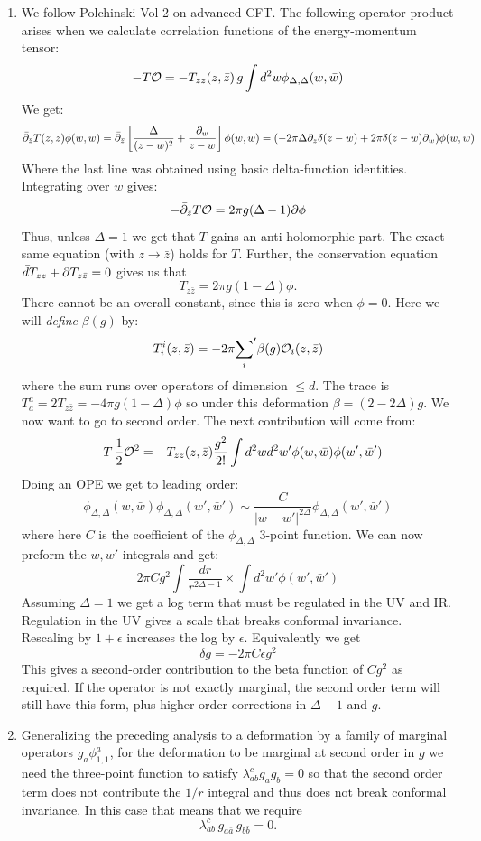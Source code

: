 \documentclass[11pt]{article}
\begin{document}
\begin{enumerate}
	\item We follow Polchinski Vol 2 on advanced CFT. The following operator product arises when we calculate correlation functions of the energy-momentum tensor:
	\[
		- T \mathcal{O} = - T_{zz}(z, \bar z)\, g \int d^2 w \phi_{\Delta, \Delta}(w, \bar w)
	\]
	We get:
	\[
		\bar {\partial}_{\bar z} T(z, \bar z) \phi(w, \bar w) = \bar {\partial}_{\bar z} \left[ \frac{\Delta}{(z-w)^2} + \frac{\partial_w}{z- w} \right] \phi(w, \bar w) = (-2 \pi \Delta \partial_z \delta(z - w) + 2 \pi \delta(z - w) \partial_w) \phi(w, \bar w)
	\]
	Where the last line was obtained using basic delta-function identities. Integrating over $w$ gives:
	\[
		- \bar {\partial}_{\bar z} T \mathcal{O} = 2 \pi g (\Delta - 1) \partial \phi
	\]
	Thus, unless $\Delta = 1$ we get that $T$ gains an anti-holomorphic part. The exact same equation (with $z \to \bar z$) holds for $\bar T$. Further, the conservation equation $\bar d T_{zz} + \partial T_{z \bar z} = 0$ gives us that
	\[
		T_{z \bar z} = 2 \pi g (1 - \Delta) \phi.
	\]
	There cannot be an overall constant, since this is zero when $\phi = 0$. Here we will \emph{define} $\beta(g)$ by:
	\[
		T^i_i(z, \bar z) = - 2\pi {\sum_{i}}' \beta(g) \mathcal{O}_i(z, \bar z)
	\]
	where the sum runs over operators of dimension $\leq d$. The trace is $T^a_a = 2 T_{z \bar z} = - 4 \pi g (1 - \Delta) \phi$ so under this deformation $\beta = (2 - 2\Delta) g$. We now want to go to second order. The next contribution will come from:
	\[
		- T\, \frac12 \mathcal{O}^2 = - T_{zz} (z, \bar z) \frac{g^2}{2!} \int d^2w d^2w' \phi(w, \bar w) \phi(w', \bar w')
	\]
	Doing an OPE we get to leading order:
	\[
		\phi_{\Delta, \Delta}(w, \bar w) \phi_{\Delta, \Delta}(w', \bar w') \sim \frac{C}{|w-w'|^{2 \Delta}} \phi_{\Delta, \Delta}(w', \bar w')
	\]
	where here $C$ is the coefficient of the $\phi_{\Delta, \Delta}$ 3-point function. We can now preform the $w, w'$ integrals and get:
	\[
		2 \pi C g^2 \int \frac{dr}{r^{2\Delta-1}} \times \int d^2w' \phi(w', \bar w')
	\]
	Assuming $\Delta = 1$ we get a log term that must be regulated in the UV and IR. Regulation in the UV gives a scale that breaks conformal invariance. Rescaling by $1+\epsilon$ increases the log by $\epsilon$. Equivalently we get
	\[
		\delta g = -2 \pi C \epsilon g^2
	\]
	This gives a second-order contribution to the beta function of $C g^2$ as required. If the operator is not exactly marginal, the second order term will still have this form, plus higher-order corrections in $\Delta -1$ and $g$. 

	\item Generalizing the preceding analysis to a deformation by a family of marginal operators $g_a \phi^a_{1,1}$, for the deformation to be marginal at second order in $g$ we need the three-point function to satisfy $\lambda_{ab}^c g_a g_b = 0$ so that the second order term does not contribute the $1/r$ integral and thus does not break conformal invariance. In this case that means that we require
	\[
		\lambda_{a b}^c \, g_{a \bar a} \, g_{b \bar b} = 0.
	\] 
	

\end{enumerate}
\end{document}
